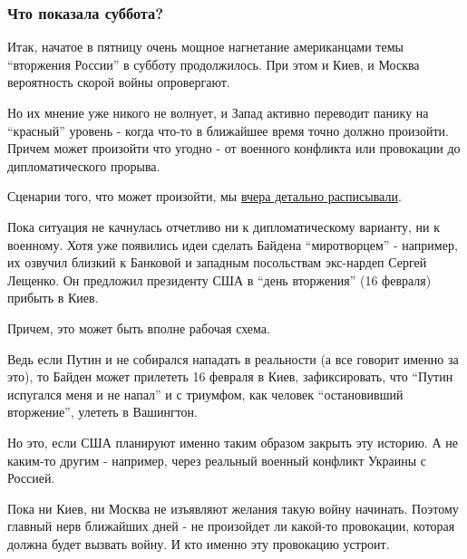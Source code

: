 
 
 
 
 

\subsubsection{Что показала суббота?}
\label{sec:13_02_2022.stz.news.ua.strana.1.vozduh_blokada.4.chto_pokazala_subbota}

Итак, начатое в пятницу очень мощное нагнетание американцами темы \enquote{вторжения
России} в субботу продолжилось. При этом и Киев, и Москва вероятность скорой
войны опровергают.

Но их мнение уже никого не волнует, и Запад активно переводит панику на
\enquote{красный} уровень - когда что-то в ближайшее время точно должно произойти.
Причем может произойти что угодно - от военного конфликта или провокации до
дипломатического прорыва. 

Сценарии того, что может произойти, мы \href{https://strana.news/news/376303-ssha-zajavili-chto-rossija-napadet-15-fevralja-chto-proiskhodit.html}{вчера детально расписывали}. 

Пока ситуация не качнулась отчетливо ни к дипломатическому варианту, ни к
военному. Хотя уже появились идеи сделать Байдена \enquote{миротворцем} -
например, их озвучил близкий к Банковой и западным посольствам экс-нардеп
Сергей Лещенко. Он предложил президенту США в \enquote{день вторжения} (16
февраля) прибыть в Киев. 

Причем, это может быть вполне рабочая схема.

Ведь если Путин и не собирался нападать в реальности (а все говорит именно за
это), то Байден может прилететь 16 февраля в Киев, зафиксировать, что
\enquote{Путин испугался меня и не напал} и с триумфом, как человек
\enquote{остановивший вторжение}, улететь в Вашингтон.

Но это, если США планируют именно таким образом закрыть эту историю. А не
каким-то другим - например, через реальный военный конфликт Украины с Россией. 

Пока ни Киев, ни Москва не изъявляют желания такую войну начинать. Поэтому
главный нерв ближайших дней - не произойдет ли какой-то провокации, которая
должна будет вызвать войну. И кто именно эту провокацию устроит.
